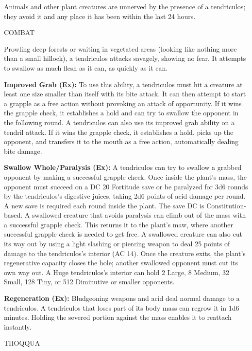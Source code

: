 \documentclass{article}
\begin{document}
Animals and other plant creatures are unnerved by the presence of a tendriculos; 
they avoid it and any place it has been within the last 24 hours.

COMBAT

Prowling deep forests or waiting in vegetated areas (looking like nothing more 
than a small hillock), a tendriculos attacks savagely, showing no fear. It attempts 
to swallow as much flesh as it can, as quickly as it can.

\textbf{Improved Grab (Ex): }To use this ability, a tendriculos must hit a creature 
at least one size smaller than itself with its bite attack. It can then attempt 
to start a grapple as a free action without provoking an attack of opportunity. 
If it wins the grapple check, it establishes a hold and can try to swallow the 
opponent in the following round. A tendriculos can also use its improved grab ability 
on a tendril attack. If it wins the grapple check, it establishes a hold, picks 
up the opponent, and transfers it to the mouth as a free action, automatically 
dealing bite damage.

\textbf{Swallow Whole/Paralysis (Ex): }A tendriculos can try to swallow a grabbed 
opponent by making a successful grapple check. Once inside the plant's mass, the 
opponent must succeed on a DC 20 Fortitude save or be paralyzed for 3d6 rounds 
by the tendriculos's digestive juices, taking 2d6 points of acid damage per round. 
A new save is required each round inside the plant. The save DC is Constitution-based. 
A swallowed creature that avoids paralysis can climb out of the mass with a successful 
grapple check. This returns it to the plant's maw, where another successful grapple 
check is needed to get free. A swallowed creature can also cut its way out by using 
a light slashing or piercing weapon to deal 25 points of damage to the tendriculos's 
interior (AC 14). Once the creature exits, the plant's regenerative capacity closes 
the hole; another swallowed opponent must cut its own way out. A Huge tendriculos's 
interior can hold 2 Large, 8 Medium, 32 Small, 128 Tiny, or 512 Diminutive or smaller 
opponents. 

\textbf{Regeneration (Ex): }Bludgeoning weapons and acid deal normal damage to 
a tendriculos. A tendriculos that loses part of its body mass can regrow it in 
1d6 minutes. Holding the severed portion against the mass enables it to reattach 
instantly. 

\vspace{12pt}
{\LARGE{}THOQQUA}
\end{document}
